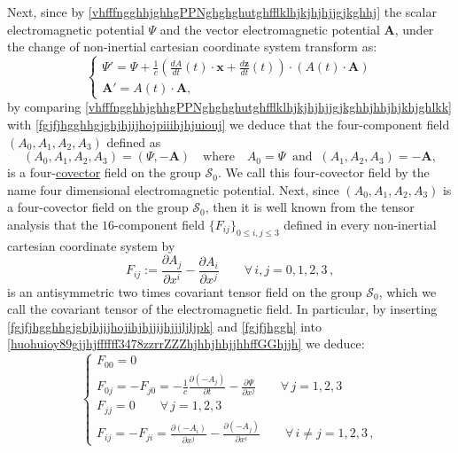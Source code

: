 \documentclass{article}
\theoremstyle{definition}
\theoremstyle{remark}
\renewcommand{\vec}[1]{\mathbf{#1}}
\newcommand{\er}{\eqref}
\newcommand{\er}{\eqref}
\begin{document}
Next, since by
\er{vhfffngghhjghhgPPNghghghutghfflklhjkjhjhjjgjkghhj} the scalar
electromagnetic potential $\Psi$ and the vector electromagnetic
potential $\vec A$, under the change of non-inertial cartesian
coordinate system transform as:
\begin{equation}\label{vhfffngghhjghhgPPNghghghutghfflklhjkjhjhjjgjkghhjhhjhjkhjghlkk}
\begin{cases}
\Psi'=
\Psi+\frac{1}{c}\left(\frac{dA}{dt}(t)\cdot\vec x+\frac{d\vec
z}{dt}(t)\right)\cdot\left(A(t)\cdot\vec A\right)
\\
\vec A'=A(t)\cdot \vec A,
\end{cases}
\end{equation}
by comparing
\er{vhfffngghhjghhgPPNghghghutghfflklhjkjhjhjjgjkghhjhhjhjkhjghlkk}
with \er{fgjfjhgghhgjghjhjijhojpiiihjhjuiouj} we deduce that the
four-component field $(A_0,A_1,A_2,A_3)$ defined as
\begin{equation}\label{fgjfjhgghhgjghjhjijhojihjhjjijhjjjljljpk}
(A_0,A_1,A_2,A_3)=(\Psi,-\vec A)\quad\text{where}\quad
A_0=\Psi\;\;\text{and}\;\;(A_1,A_2,A_3)=-\vec A,
\end{equation}
is a four-\underline{covector} field on the group $\mathcal{S}_0$.
We call this  four-covector field by the name four dimensional
electromagnetic potential. Next, since $(A_0,A_1,A_2,A_3)$ is a
four-covector field on the group $\mathcal{S}_0$, then it is well
known from the tensor analysis that the $16$-component field
$\{F_{ij}\}_{0\leq i,j\leq 3}$ defined in every non-inertial
cartesian coordinate system by
\begin{equation}\label{huohuioy89gjjhjffffff3478zzrrZZZhjhhjhhjjhhffGGhjjh}
F_{ij}:=\frac{\partial A_j}{\partial x^i}-\frac{\partial
A_i}{\partial x^j}\quad\quad\forall\, i,j=0,1,2,3\,,
\end{equation}
is an antisymmetric two times covariant tensor field on the group
$\mathcal{S}_0$, which we call the covariant tensor of the
electromagnetic field. In particular, by inserting
\er{fgjfjhgghhgjghjhjijhojihjhjjijhjjjljljpk} and \er{fgjfjhggh}
into \er{huohuioy89gjjhjffffff3478zzrrZZZhjhhjhhjjhhffGGhjjh} we
deduce:
\begin{equation}\label{huohuioy89gjjhjffffff3478zzrrZZZhjhhjhhjjhhffGGhjjhiuui}
\begin{cases}
F_{00}=0\\ F_{0j}=-F_{j0}=-\frac{1}{c}\frac{\partial(-A_j)}{\partial
t}-\frac{\partial \Psi}{\partial
x^j}\quad\quad\forall\, j=1,2,3\\
F_{jj}=0\quad\quad\forall\, j=1,2,3
\\
F_{ij}=-F_{ji}=\frac{\partial (-A_i)}{\partial x^j}-\frac{\partial
(-A_j)}{\partial x^i}\quad\quad\forall\, i\neq j=1,2,3\,,
\end{cases}
\end{equation}
\end{document}
